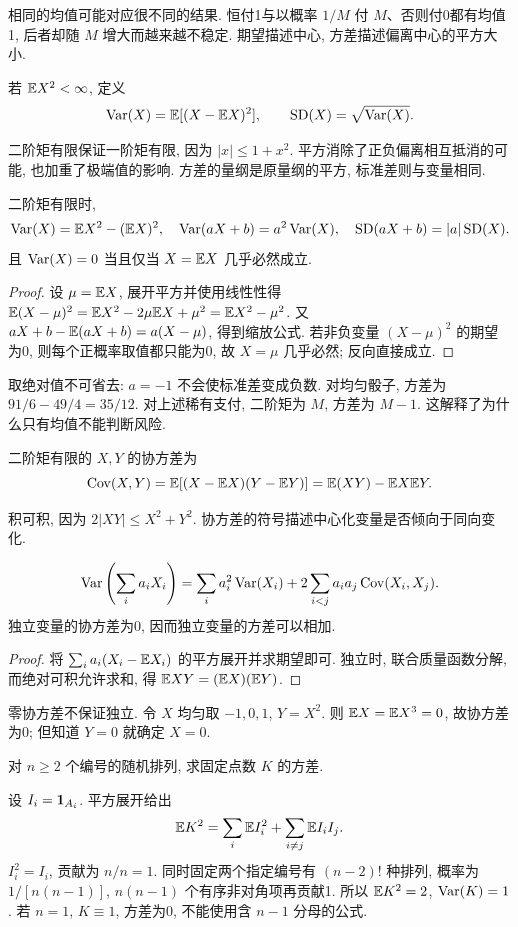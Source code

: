 相同的均值可能对应很不同的结果. 恒付1与以概率 $1/M$ 付 $M$、否则付0都有均值1, 后者却随 $M$ 增大而越来越不稳定. 期望描述中心, 方差描述偏离中心的平方大小.
\begin{definition}
若 $\mathbb E X^2<\infty$, 定义
\[
\operatorname{Var}(X)=\mathbb E[(X-\mathbb E X)^2],\qquad
\operatorname{SD}(X)=\sqrt{\operatorname{Var}(X)}.
\]
\end{definition}
二阶矩有限保证一阶矩有限, 因为 $|x|\le1+x^2$. 平方消除了正负偏离相互抵消的可能, 也加重了极端值的影响. 方差的量纲是原量纲的平方, 标准差则与变量相同.
\begin{proposition}
二阶矩有限时,
\[
\operatorname{Var}(X)=\mathbb E X^2-(\mathbb E X)^2,\quad
\operatorname{Var}(aX+b)=a^2\operatorname{Var}(X),\quad
\operatorname{SD}(aX+b)=|a|\operatorname{SD}(X).
\]
且 $\operatorname{Var}(X)=0$ 当且仅当 $X=\mathbb E X$ 几乎必然成立.
\end{proposition}
\begin{proof}
设 $\mu=\mathbb E X$, 展开平方并使用线性性得
$\mathbb E(X-\mu)^2=\mathbb E X^2-2\mu\mathbb E X+\mu^2=\mathbb E X^2-\mu^2$.
又 $aX+b-\mathbb E(aX+b)=a(X-\mu)$, 得到缩放公式. 若非负变量 $(X-\mu)^2$ 的期望为0, 则每个正概率取值都只能为0, 故 $X=\mu$ 几乎必然; 反向直接成立.
\end{proof}
取绝对值不可省去: $a=-1$ 不会使标准差变成负数. 对均匀骰子, 方差为 $91/6-49/4=35/12$. 对上述稀有支付, 二阶矩为 $M$, 方差为 $M-1$. 这解释了为什么只有均值不能判断风险.

\begin{definition}
二阶矩有限的 $X,Y$ 的协方差为
\[
\operatorname{Cov}(X,Y)=\mathbb E[(X-\mathbb E X)(Y-\mathbb E Y)]=\mathbb E(XY)-\mathbb E X\mathbb E Y.
\]
\end{definition}
积可积, 因为 $2|XY|\le X^2+Y^2$. 协方差的符号描述中心化变量是否倾向于同向变化.
\begin{proposition}[和的方差]
\[
\operatorname{Var}\left(\sum_i a_iX_i\right)=\sum_i a_i^2\operatorname{Var}(X_i)
+2\sum_{i<j}a_ia_j\operatorname{Cov}(X_i,X_j).
\]
独立变量的协方差为0, 因而独立变量的方差可以相加.
\end{proposition}
\begin{proof}
将 $\sum_i a_i(X_i-\mathbb E X_i)$ 的平方展开并求期望即可. 独立时, 联合质量函数分解, 而绝对可积允许求和, 得 $\mathbb E XY=(\mathbb E X)(\mathbb E Y)$.
\end{proof}
零协方差不保证独立. 令 $X$ 均匀取 $-1,0,1$, $Y=X^2$. 则 $\mathbb E X=\mathbb E X^3=0$, 故协方差为0; 但知道 $Y=0$ 就确定 $X=0$.

\begin{example}
对 $n\ge2$ 个编号的随机排列, 求固定点数 $K$ 的方差.
\end{example}
\begin{solution}
设 $I_i=\mathbf 1_{A_i}$. 平方展开给出
\[
\mathbb E K^2=\sum_i\mathbb E I_i^2+\sum_{i\ne j}\mathbb E I_iI_j.
\]
$I_i^2=I_i$, 贡献为 $n/n=1$. 同时固定两个指定编号有 $(n-2)!$ 种排列, 概率为 $1/[n(n-1)]$, $n(n-1)$ 个有序非对角项再贡献1. 所以 $\mathbb E K^2=2$, $\operatorname{Var}(K)=1$. 若 $n=1$, $K\equiv1$, 方差为0, 不能使用含 $n-1$ 分母的公式.
\end{solution}


